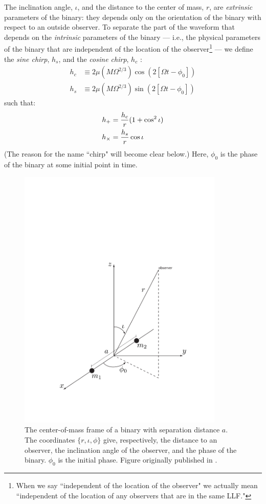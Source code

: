 The inclination angle, $\iota$, and the distance to the center of mass, $r$, are \emph{extrinsic} parameters of the binary: they depends only on the orientation of the binary with respect to an outside observer. To separate the part of the waveform that depends on the \emph{intrinsic} parameters of the binary --- i.e., the physical parameters of the binary that are independent of the location of the observer\footnote{When we say ``independent of the location of the observer" we actually mean ``independent of the location of any observers that are in the same \ac{LLF}."} --- we define the \emph{sine chirp}, $h_s$, and the \emph{cosine chirp}, $h_c$ \cite{Brown}:
\begin{subequations}
\label{eqn:cos_sin_chirp}
\begin{align}
h_c &\equiv 2 \mu (M \Omega^{2/3}) \cos(2[\Omega t - \phi_0] ) \\
h_s &\equiv 2 \mu (M \Omega^{2/3}) \sin(2[\Omega t - \phi_0] )
\end{align}
\end{subequations}
such that:
\begin{subequations}
\label{eqn:hpls_hcrs}
\begin{align}
h_{+} &= \frac{h_c}{r} (1 + \cos^2\iota) \\
h_{\times} &= \frac{h_s}{r} \cos\iota
\end{align}
\end{subequations}
(The reason for the name ``chirp" will become clear below.) Here, $\phi_0$ is the phase of the binary at some initial point in time.

\begin{figure}
\center
\includegraphics[height=5in]{figures/binary.pdf}
\caption{The center-of-mass frame of a binary with separation distance $a$. The coordinates $\{r,\iota,\phi\}$ give, respectively, the distance to an observer, the inclination angle of the observer, and the phase of the binary. $\phi_0$ is the initial phase. Figure originally published in \cite{Brown}.}
\label{fig:binary_coords}
\end{figure}


